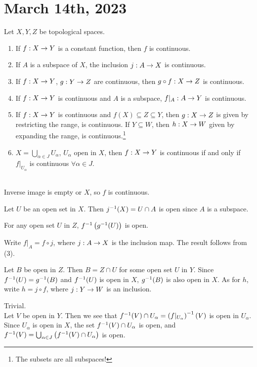 \section*{March 14th, 2023}

  Let \(X, Y, Z\) be topological spaces.
\begin{enumerate}
    \item If \(f: X \rightarrow Y\) is a constant function, then \(f\) is continuous.
    \item If \(A\) is a subspace of \(X\), the inclusion \(j : A \rightarrow X\) is continuous.
    \item If \(f : X \rightarrow Y\), \(g : Y \rightarrow Z\) are continuous, then \(g \circ f : X \rightarrow Z\) is continuous.
    \item If \(f: X \rightarrow Y\) is continuous and \(A\) is a subspace, \(f|_A: A \rightarrow Y\) is continuous.
    \item If \(f : X \rightarrow Y\) is continuous and \(f(X) \subseteq Z \subseteq Y\), then \(g : X \rightarrow Z\) is given by restricting the range, is continuous. If \(Y \subseteq W\), then \(h : X \rightarrow W\) given by expanding the range, is continuous.\footnote{The subsets are all subspaces!}
    \item \(X = \bigcup_{\alpha \in J} U_\alpha\), \(U_\alpha\) open in \(X\), then \(f : X \rightarrow Y\) is continuous if and only if \(f|_{U_\alpha}\) is continuous \(\forall \alpha \in J\).
\end{enumerate}

\pf \\
 Inverse image is empty or \(X\), so \(f\) is continuous.

 Let \(U\) be an open set in \(X\). Then \(j^{-1}(X) = U \cap A\) is open since \(A\) is a subspace.

 For any open set \(U\) in \(Z\), \(f^{-1}\left( g^{-1}(U) \right)\) is open.

 Write \(f|_A = f \circ j\), where \(j: A \rightarrow X\) is the inclusion map. The result follows from (3).

 Let \(B\) be open in \(Z\). Then \(B = Z \cap U\) for some open set \(U\) in \(Y\). Since \(f^{-1}(U) = g^{-1}(B)\) and \(f^{-1}(U)\) is open in \(X\), \(g^{-1}(B)\) is also open in \(X\). As for \(h\), write \(h = j \circ f\), where \(j : Y \rightarrow W\) is an inclusion.

 \note{\mimp} Trivial. \\
\note{\mimpd} Let \(V\) be open in \(Y\). Then we see that \(f^{-1}(V)\cap U_\alpha = \left( f|_{U_\alpha} \right)^{-1}(V)\) is open in \(U_\alpha\). Since \(U_\alpha\) is open in \(X\), the set \(f^{-1}(V)\cap U_\alpha\) is open, and \(f^{-1}(V) = \bigcup_{\alpha \in J} \left( f^{-1}(V) \cap U_\alpha \right)\) is open.

